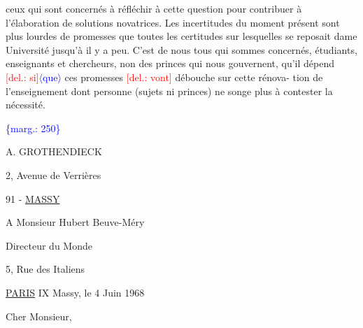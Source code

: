 \documentclass[11pt]{article}
\newcommand{\scanpage}[1]{\par\bigskip\noindent{\small\sffamily[scan #1]}\par}
\newcommand{\mspage}[1]{{\small\sffamily[p.\,#1]}}
\let\over\relax
\newcommand{\over}[2]{\textcolor{gray}{#1}\textcolor{blue}{\ensuremath{^{\!\nearrow}}#2}}
\newcommand{\inserted}[2][]{\textcolor{blue}{$\langle$#2$\rangle$}}
\newcommand{\margin}[1]{\textcolor{blue}{\{\textsf{marg.:} #1\}}}
\newcommand{\deleted}[1]{\textcolor{red}{[\textsf{del.:} #1]}}
\newcommand{\uline}[1]{\underline{#1}}
\begin{document}
\clearpage
\scanpage{119/250}
\mspage{10}

ceux qui sont concernés à réfléchir à cette question pour contribuer à
l'élaboration de solutions novatrices. Les incertitudes du moment présent
sont plus lourdes de promesses que toutes les certitudes sur lesquelles se
reposait dame Université jusqu'à il y a peu. C'est de nous tous qui sommes
concernés, étudiants, enseignants et chercheurs, non des princes qui nous
gouvernent, qu'il dépend \deleted{si}\inserted{que} ces promesses \deleted{vont} débouche\over{r}{nt} sur cette rénova-%
tion de l'enseignement dont personne (sujets ni princes) ne songe plus à
contester la nécessité.

\margin{250}

\clearpage
\scanpage{119/251}
A. GROTHENDIECK

2, Avenue de Verrières

91 - \uline{MASSY}

A Monsieur Hubert Beuve-Méry

Directeur du Monde

5, Rue des Italiens

\uline{PARIS} IX \hfill Massy, le 4 Juin 1968

Cher Monsieur,
\end{document}
